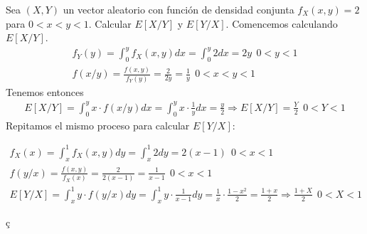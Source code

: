 \begin{ejercicio}
    Sea $(X,Y)$ un vector aleatorio con función de densidad conjunta $f_X(x,y)=2$ para $0<x<y<1$. Calcular $E[X/Y]$ y $E[Y/X]$.
    \endsquare
    Comencemos calculando $E[X/Y]$.
    \begin{gather*}
        f_Y(y) = \int_0^y f_X(x,y) dx = \int_0^y 2 dx = 2y \ \ 0<y<1\\
        f(x/y) = \frac{f(x,y)}{f_Y(y)} = \frac{2}{2y} = \frac{1}{y} \ \ 0<x<y<1
    \end{gather*}
    Tenemos entonces
    \begin{gather*}
        E[X/Y] = \int_0^y x \cdot f(x/y) dx = \int_0^y x \cdot \frac{1}{y} dx = \frac{y}{2} \Rightarrow E[X/Y] = \frac{Y}{2} \ \ 0<Y<1
    \end{gather*}
    Repitamos el mismo proceso para calcular $E[Y/X]$:

    \begin{gather*}
        f_X(x) = \int_x^1 f_X(x,y)dy = \int_x^1 2 dy = 2(x-1) \ \ 0<x<1\\
        f(y/x) = \frac{f(x,y)}{f_X(x)} = \frac{2}{2(x-1)} = \frac{1}{x-1} \ \ 0<x<1\\
        E[Y/X] = \int_x^1 y \cdot f(y/x) dy =  \int_x^1 y \cdot \frac{1}{x-1} dy= \frac{1}{x} \cdot \frac{1-x^2}{2} = \frac{1+x}{2} \Rightarrow \frac{1+X}{2}\ \ 0<X<1 
    \end{gather*}
\end{ejercicio}ç

